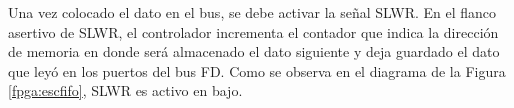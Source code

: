 	Una vez colocado el dato en el bus, se debe activar la señal SLWR. En el flanco asertivo de SLWR, el controlador incrementa el contador que indica la dirección de memoria en donde será almacenado el dato siguiente y deja guardado el dato que leyó en los puertos del bus FD. Como se observa en el diagrama de la Figura \ref{fpga:escfifo}, SLWR es activo en bajo.